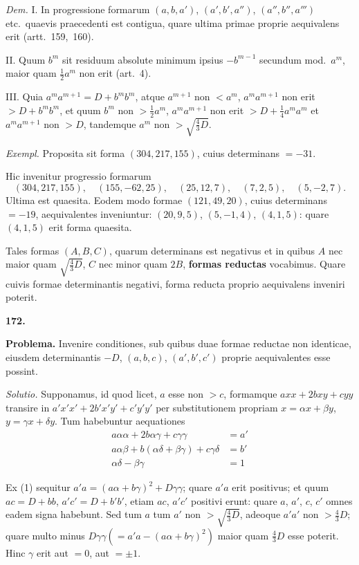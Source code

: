 \documentclass[12pt,a4paper]{article}
\theoremstyle{plain}
\begin{document}
\textit{Dem.} I. In progressione formarum $(a,b,a')$, $(a',b',a'')$, $(a'',b'',a''')$ etc.~quaevis praecedenti est contigua, quare ultima primae proprie aequivalens erit (artt.~159,~160).

II. Quum $b^m$ sit residuum absolute minimum ipsius $-b^{m-1}$ secundum mod.~$a^m$, maior quam $\frac{1}{2}a^m$ non erit (art.~4).

III. Quia $a^m a^{m+1} = D + b^m b^m$, atque $a^{m+1}$ non $< a^m$, $a^m a^{m+1}$ non erit $> D + b^m b^m$, et quum $b^m$ non $> \frac{1}{2}a^m$, $a^m a^{m+1}$ non erit $> D + \frac{1}{4}a^m a^m$ et $a^m a^{m+1}$ non $> D$, tandemque $a^m$ non $> \sqrt{\frac{4}{3}D}$.

\textit{Exempl.} Proposita sit forma $(304, 217, 155)$, cuius determinans $= -31$.

Hic invenitur progressio formarum
\[
(304, 217, 155), \quad (155, -62, 25), \quad (25, 12, 7), \quad (7, 2, 5), \quad (5, -2, 7).
\]
Ultima est quaesita. Eodem modo formae $(121, 49, 20)$, cuius determinans $= -19$, aequivalentes inveniuntur: $(20, 9, 5)$, $(5, -1, 4)$, $(4, 1, 5)$: quare $(4, 1, 5)$ erit forma quaesita.

Tales formas $(A, B, C)$, quarum determinans est negativus et in quibus $A$ nec maior quam $\sqrt{\frac{4}{3}D}$, $C$ nec minor quam $2B$, \textbf{formas reductas} vocabimus. Quare cuivis formae determinantis negativi, forma reducta proprio aequivalens inveniri poterit.

\bigskip

\textbf{172.}

\textbf{Problema.} Invenire conditiones, sub quibus duae formae reductae non identicae, eiusdem determinantis $-D$, $(a,b,c)$, $(a',b',c')$ proprie aequivalentes esse possint.

\textit{Solutio.} Supponamus, id quod licet, $a$ esse non $> c$, formamque $axx + 2bxy + cyy$ transire in $a'x'x' + 2b'x'y' + c'y'y'$ per substitutionem propriam $x = \alpha x + \beta y$, $y = \gamma x + \delta y$. Tum habebuntur aequationes
\begin{align*}
a\alpha\alpha + 2b\alpha\gamma + c\gamma\gamma &= a' \tag{1}\\
a\alpha\beta + b(\alpha\delta + \beta\gamma) + c\gamma\delta &= b' \tag{2}\\
\alpha\delta - \beta\gamma &= 1 \tag{3}
\end{align*}

Ex (1) sequitur $a'a = (a\alpha + b\gamma)^2 + D\gamma\gamma$; quare $a'a$ erit positivus; et quum $ac = D + bb$, $a'c' = D + b'b'$, etiam $ac$, $a'c'$ positivi erunt: quare $a$, $a'$, $c$, $c'$ omnes eadem signa habebunt. Sed tum $a$ tum $a'$ non $> \sqrt{\frac{4}{3}D}$, adeoque $a'a'$ non $> \frac{4}{3}D$; quare multo minus $D\gamma\gamma (= a'a - (a\alpha + b\gamma)^2)$ maior quam $\frac{4}{3}D$ esse poterit. Hinc $\gamma$ erit aut $=0$, aut $= \pm 1$.
\end{document}
